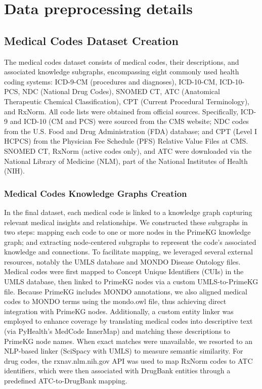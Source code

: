 \onecolumn

\section{Data preprocessing details}
\label{appendix_dataset}
\subsection{Medical Codes Dataset Creation}
The medical codes dataset consists of medical codes, their descriptions, and associated knowledge subgraphs, encompassing eight commonly used health coding systems: ICD-9-CM (procedures and diagnoses), ICD-10-CM, ICD-10-PCS, NDC (National Drug Codes), SNOMED CT, ATC (Anatomical Therapeutic Chemical Classification), CPT (Current Procedural Terminology), and RxNorm. All code lists were obtained from official sources. Specifically, ICD-9 and ICD-10 (CM and PCS) were sourced from the CMS website; NDC codes from the U.S. Food and Drug Administration (FDA) database; and CPT (Level I HCPCS) from the Physician Fee Schedule (PFS) Relative Value Files at CMS. SNOMED CT, RxNorm (active codes only), and ATC were downloaded via the National Library of Medicine (NLM), part of the National Institutes of Health (NIH).

\subsubsection{Medical Codes Knowledge Graphs Creation}
In the final dataset, each medical code is linked to a knowledge graph capturing relevant medical insights and relationships. We constructed these subgraphs in two steps: mapping each code to one or more nodes in the PrimeKG knowledge graph; and extracting node-centered subgraphs to represent the code’s associated knowledge and connections.
To facilitate mapping, we leveraged several external resources, notably the UMLS database and MONDO Disease Ontology files. Medical codes were first mapped to Concept Unique Identifiers (CUIs) in the UMLS database, then linked to PrimeKG nodes via a custom UMLS-to-PrimeKG file. Because PrimeKG includes MONDO annotations, we also aligned medical codes to MONDO terms using the mondo.owl file, thus achieving direct integration with PrimeKG nodes. Additionally, a custom entity linker was employed to enhance coverage by translating medical codes into descriptive text (via PyHealth’s MedCode InnerMap) and matching these descriptions to PrimeKG node names. When exact matches were unavailable, we resorted to an NLP-based linker (SciSpacy with UMLS) to measure semantic similarity. For drug codes, the rxnav.nlm.nih.gov API was used to map RxNorm codes to ATC identifiers, which were then associated with DrugBank entities through a predefined ATC-to-DrugBank mapping.

